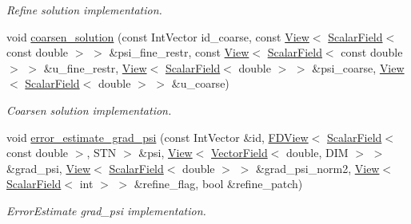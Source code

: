 \begin{DoxyCompactItemize}
\begin{DoxyCompactList}\small\item\em Refine solution implementation. \end{DoxyCompactList}\item 
void \hyperlink{classUintah_1_1PhaseField_1_1PureMetal_a9a053dd33303155fb53ae40d779ff817}{coarsen\+\_\+solution} (const Int\+Vector id\+\_\+coarse, const \hyperlink{namespaceUintah_1_1PhaseField_a59210a1e28eba254d428762c92ddeabb}{View}$<$ \hyperlink{structUintah_1_1PhaseField_1_1ScalarField}{Scalar\+Field}$<$ const double $>$ $>$ \&psi\+\_\+fine\+\_\+restr, const \hyperlink{namespaceUintah_1_1PhaseField_a59210a1e28eba254d428762c92ddeabb}{View}$<$ \hyperlink{structUintah_1_1PhaseField_1_1ScalarField}{Scalar\+Field}$<$ const double $>$ $>$ \&u\+\_\+fine\+\_\+restr, \hyperlink{namespaceUintah_1_1PhaseField_a59210a1e28eba254d428762c92ddeabb}{View}$<$ \hyperlink{structUintah_1_1PhaseField_1_1ScalarField}{Scalar\+Field}$<$ double $>$ $>$ \&psi\+\_\+coarse, \hyperlink{namespaceUintah_1_1PhaseField_a59210a1e28eba254d428762c92ddeabb}{View}$<$ \hyperlink{structUintah_1_1PhaseField_1_1ScalarField}{Scalar\+Field}$<$ double $>$ $>$ \&u\+\_\+coarse)
\begin{DoxyCompactList}\small\item\em Coarsen solution implementation. \end{DoxyCompactList}\item 
void \hyperlink{classUintah_1_1PhaseField_1_1PureMetal_a9c33b606b2a822fb32a0bc864aab99fa}{error\+\_\+estimate\+\_\+grad\+\_\+psi} (const Int\+Vector \&id, \hyperlink{namespaceUintah_1_1PhaseField_a63032464b1cd54eaa53c1c29109746ac}{F\+D\+View}$<$ \hyperlink{structUintah_1_1PhaseField_1_1ScalarField}{Scalar\+Field}$<$ const double $>$, S\+TN $>$ \&psi, \hyperlink{namespaceUintah_1_1PhaseField_a59210a1e28eba254d428762c92ddeabb}{View}$<$ \hyperlink{structUintah_1_1PhaseField_1_1VectorField}{Vector\+Field}$<$ double, D\+IM $>$ $>$ \&grad\+\_\+psi, \hyperlink{namespaceUintah_1_1PhaseField_a59210a1e28eba254d428762c92ddeabb}{View}$<$ \hyperlink{structUintah_1_1PhaseField_1_1ScalarField}{Scalar\+Field}$<$ double $>$ $>$ \&grad\+\_\+psi\+\_\+norm2, \hyperlink{namespaceUintah_1_1PhaseField_a59210a1e28eba254d428762c92ddeabb}{View}$<$ \hyperlink{structUintah_1_1PhaseField_1_1ScalarField}{Scalar\+Field}$<$ int $>$ $>$ \&refine\+\_\+flag, bool \&refine\+\_\+patch)
\begin{DoxyCompactList}\small\item\em Error\+Estimate grad\+\_\+psi implementation. \end{DoxyCompactList}\end{DoxyCompactItemize}
